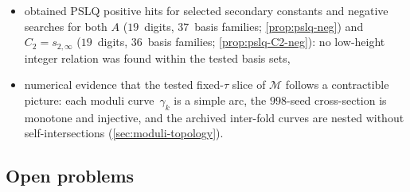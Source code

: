 \documentclass[11pt,a4paper]{article}
\theoremstyle{plain}
\theoremstyle{definition}
\theoremstyle{remark}
\begin{document}
\begin{itemize}[nosep]
  holomorphic distortion differential, while the implementation-side
  mixed-term normalization remains an audit-level statement,
\item obtained PSLQ positive hits for selected secondary constants and
  negative searches for
  both $A$ ($19$~digits, $37$~basis families; \cref{prop:pslq-neg}) and
  $C_2 = s_{2,\infty}$ ($19$~digits, $36$~basis families;
  \cref{prop:pslq-C2-neg}): no low-height integer relation
  was found within the tested basis sets,
\item numerical evidence that the tested fixed-$\tau$ slice of
  $\mathcal{M}$ follows a contractible picture:
  each moduli curve~$\gamma_k$ is a simple arc, the $998$-seed
  cross-section is monotone and injective, and the archived inter-fold
  curves are nested without self-intersections
  (\cref{sec:moduli-topology}).
\end{itemize}

\subsection{Open problems}
\end{document}
